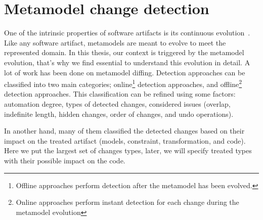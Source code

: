  \section{Metamodel change detection}
 \label{changedetection}
 One of the intrinsic properties of software artifacts is its continuous evolution~\cite{mens2008introduction}. Like any software artifact, metamodels are meant to evolve to meet the represented domain. %
 In this thesis, our context is triggered by the metamodel evolution, that's why we find essential to understand this evolution in detail.
 A lot of work has been done on metamodel diffing.
 Detection approaches can be classified into two main categories; online\footnote{Offline approaches perform detection after the metamodel has been evolved.} detection approaches, and offline\footnote{Online approaches perform instant detection for each change during the metamodel evolution} detection approaches. This classification can be refined using some factors: automation degree, types of detected changes, considered issues (overlap, indefinite length, hidden changes, order of changes, and undo operations)\cite{hebig2016approaches}.
 
 
 
  In another hand, many of them classified the detected changes based on their impact on the treated artifact (models, constraint, transformation, and code). Here we put the largest set of changes types, later, we will specify treated types with their possible impact on the code.
 
